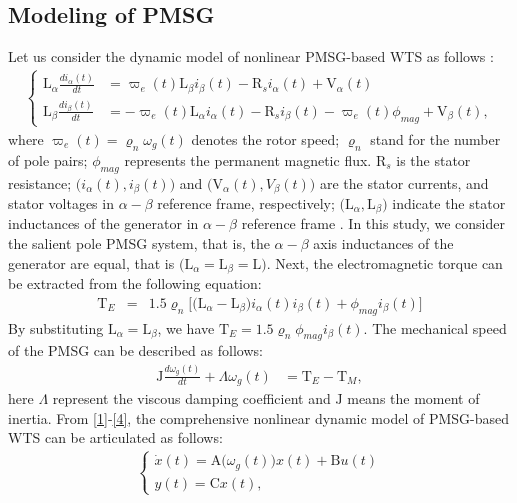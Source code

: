 \documentclass[preprint,11pt]{elsarticle}
\begin{document}
\subsection{{Modeling of PMSG}}
{Let us consider the dynamic model of nonlinear PMSG-based WTS as follows \cite{PMSG2,vel1,sub1}:}
\begin{align}
\begin{cases}\label{2}
\mathrm{L}_{\alpha}\frac{di_{\alpha}(t) }{dt}&=\varpi_e(t) \mathrm{L}_{\beta} i_{\beta}(t)
-\mathrm{R}_si_{\alpha}(t)+\mathrm{V}_{\alpha}(t)\\
\mathrm{L}_{\beta}\frac{di_{\beta} (t)}{dt} &= -\varpi_e(t) \mathrm{L}_{\alpha} i_{\alpha}(t)
-\mathrm{R}_s i_{\beta}(t)
-\varpi_e(t) \phi_{mag}+\mathrm{V}_{\beta}(t),
\end{cases}
\end{align}
where $\varpi_e(t)=\varrho_n \omega_g(t)$ denotes the rotor speed; $\varrho_n$ stand for the  number of pole pairs; $\phi_{mag}$ represents the permanent magnetic flux. $\mathrm{R}_s$ is the stator resistance; $\big(i_{\alpha}(t),i_{\beta}(t)\big)$ and $\big(\mathrm{V}_{\alpha}(t),V_{\beta}(t)\big)$ are the stator currents, and stator voltages in $\alpha-\beta$ reference frame, respectively; $\big(\mathrm{L}_{\alpha},\mathrm{L}_{\beta}\big)$ indicate the stator inductances of the generator in $\alpha-\beta$ reference frame . In this study, we consider the salient pole PMSG system, that is, the $\alpha-\beta$ axis inductances of the generator are equal, that is $\big(\mathrm{L}_{\alpha}=\mathrm{L}_{\beta}=\mathrm{L}\big)$.
Next, the electromagnetic torque can be extracted from the following equation:
\begin{eqnarray*}
\mathrm{T}_{E}&=&1.5\varrho_n\big[ \big(\mathrm{L}_{\alpha}-\mathrm{L}_{\beta}\big)i_{\alpha}(t)i_{\beta}(t)+\phi_{mag}i_{\beta}(t) \big]
\end{eqnarray*}
By substituting $\mathrm{L}_{\alpha}=\mathrm{L}_{\beta}$, we have
$
\mathrm{T}_{E}=1.5\varrho_n\phi_{mag}i_{\beta}(t).
$
The mechanical speed of the PMSG can be described as follows:
\begin{eqnarray}
\mathrm{J}\frac{d\omega_g(t)}{dt}+\Lambda \omega_g(t)&=\mathrm{T}_{E}-\mathrm{T}_{M},\label{4}
\end{eqnarray}
here $\Lambda$ represent the viscous damping coefficient and $\mathrm{J}$ means the moment of inertia.
From \eqref{1}-\eqref{4}, the comprehensive nonlinear dynamic model of PMSG-based WTS can be articulated
as follows:
\begin{eqnarray}
\begin{cases}
\dot{x}(t)=\mathrm{A}\big( \omega_g(t) \big)x(t)+\mathrm{B} u(t)\\
y(t)=\mathrm{C}x(t),\label{5}
\end{cases}
\end{eqnarray}
\end{document}
